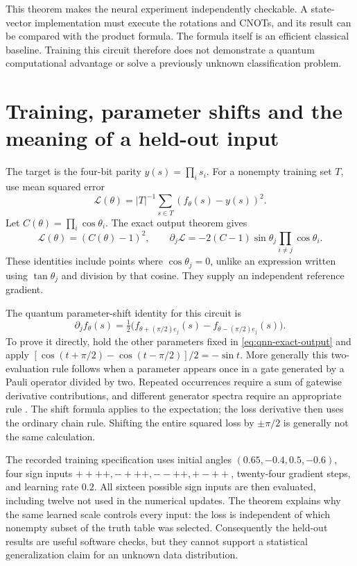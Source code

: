 This theorem makes the neural experiment independently checkable.  A
state-vector implementation must execute the rotations and CNOTs, and
its result can be compared with the product formula.  The formula itself
is an efficient classical baseline.  Training this circuit therefore
does not demonstrate a quantum computational advantage or solve a
previously unknown classification problem.

\section{Training, parameter shifts and the meaning of a held-out input}

The target is the four-bit parity $y(s)=\prod_i s_i$.  For a nonempty
training set $T$, use mean squared error
\[
 \mathcal L(\theta)=|T|^{-1}\sum_{s\in T}(f_\theta(s)-y(s))^2.
\]
Let $C(\theta)=\prod_i\cos\theta_i$.  The exact output theorem gives
\begin{equation}
 \mathcal L(\theta)=(C(\theta)-1)^2,
 \qquad
 \partial_j\mathcal L
 =-2(C-1)\sin\theta_j\prod_{i\ne j}\cos\theta_i.
 \label{eq:qnn-loss-gradient}
\end{equation}
These identities include points where $\cos\theta_j=0$, unlike an
expression written using $\tan\theta_j$ and division by that cosine.
They supply an independent reference gradient.

The quantum parameter-shift identity for this circuit is
\[
 \partial_j f_\theta(s)
 =\tfrac12\bigl(f_{\theta+(\pi/2)e_j}(s)
                -f_{\theta-(\pi/2)e_j}(s)\bigr).
\]
To prove it directly, hold the other parameters fixed in
\eqref{eq:qnn-exact-output} and apply
$[\cos(t+\pi/2)-\cos(t-\pi/2)]/2=-\sin t$.
More generally this two-evaluation rule follows when a parameter appears
once in a gate generated by a Pauli operator divided by two.  Repeated
occurrences require a sum of gatewise derivative contributions, and
different generator spectra require an appropriate rule
\cite{QSSchuld2019}.  The shift formula applies to the expectation;
the loss derivative then uses the ordinary chain rule.  Shifting the
entire squared loss by $\pm\pi/2$ is generally not the same calculation.

The recorded training specification uses initial angles
$(0.65,-0.4,0.5,-0.6)$, four sign inputs
$++++,-+++,--++,+-++$, twenty-four gradient steps, and learning rate
$0.2$.  All sixteen possible sign inputs are then evaluated, including
twelve not used in the numerical updates.  The theorem explains why the
same learned scale controls every input: the loss is independent of which
nonempty subset of the truth table was selected.  Consequently the
held-out results are useful software checks, but they cannot support a
statistical generalization claim for an unknown data distribution.

